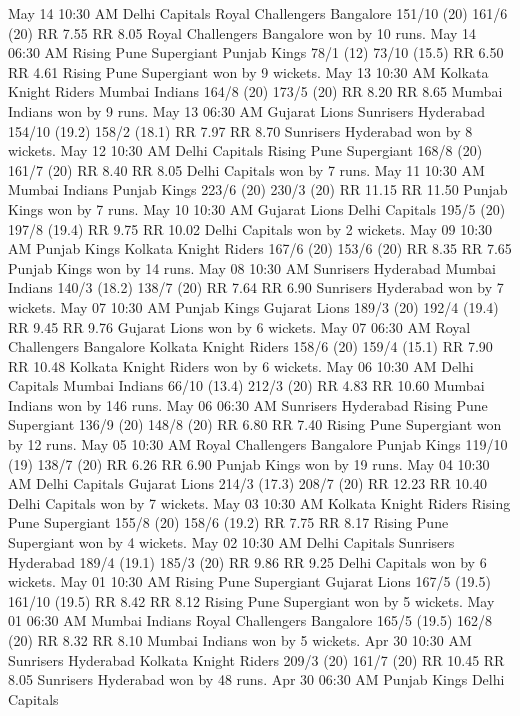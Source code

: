 May 14
10:30 AM
Delhi Capitals
Royal Challengers Bangalore
151/10 (20)
161/6 (20)
RR 7.55
RR 8.05
Royal Challengers Bangalore won by 10 runs.
May 14
06:30 AM
Rising Pune Supergiant
Punjab Kings
78/1 (12)
73/10 (15.5)
RR 6.50
RR 4.61
Rising Pune Supergiant won by 9 wickets.
May 13
10:30 AM
Kolkata Knight Riders
Mumbai Indians
164/8 (20)
173/5 (20)
RR 8.20
RR 8.65
Mumbai Indians won by 9 runs.
May 13
06:30 AM
Gujarat Lions
Sunrisers Hyderabad
154/10 (19.2)
158/2 (18.1)
RR 7.97
RR 8.70
Sunrisers Hyderabad won by 8 wickets.
May 12
10:30 AM
Delhi Capitals
Rising Pune Supergiant
168/8 (20)
161/7 (20)
RR 8.40
RR 8.05
Delhi Capitals won by 7 runs.
May 11
10:30 AM
Mumbai Indians
Punjab Kings
223/6 (20)
230/3 (20)
RR 11.15
RR 11.50
Punjab Kings won by 7 runs.
May 10
10:30 AM
Gujarat Lions
Delhi Capitals
195/5 (20)
197/8 (19.4)
RR 9.75
RR 10.02
Delhi Capitals won by 2 wickets.
May 09
10:30 AM
Punjab Kings
Kolkata Knight Riders
167/6 (20)
153/6 (20)
RR 8.35
RR 7.65
Punjab Kings won by 14 runs.
May 08
10:30 AM
Sunrisers Hyderabad
Mumbai Indians
140/3 (18.2)
138/7 (20)
RR 7.64
RR 6.90
Sunrisers Hyderabad won by 7 wickets.
May 07
10:30 AM
Punjab Kings
Gujarat Lions
189/3 (20)
192/4 (19.4)
RR 9.45
RR 9.76
Gujarat Lions won by 6 wickets.
May 07
06:30 AM
Royal Challengers Bangalore
Kolkata Knight Riders
158/6 (20)
159/4 (15.1)
RR 7.90
RR 10.48
Kolkata Knight Riders won by 6 wickets.
May 06
10:30 AM
Delhi Capitals
Mumbai Indians
66/10 (13.4)
212/3 (20)
RR 4.83
RR 10.60
Mumbai Indians won by 146 runs.
May 06
06:30 AM
Sunrisers Hyderabad
Rising Pune Supergiant
136/9 (20)
148/8 (20)
RR 6.80
RR 7.40
Rising Pune Supergiant won by 12 runs.
May 05
10:30 AM
Royal Challengers Bangalore
Punjab Kings
119/10 (19)
138/7 (20)
RR 6.26
RR 6.90
Punjab Kings won by 19 runs.
May 04
10:30 AM
Delhi Capitals
Gujarat Lions
214/3 (17.3)
208/7 (20)
RR 12.23
RR 10.40
Delhi Capitals won by 7 wickets.
May 03
10:30 AM
Kolkata Knight Riders
Rising Pune Supergiant
155/8 (20)
158/6 (19.2)
RR 7.75
RR 8.17
Rising Pune Supergiant won by 4 wickets.
May 02
10:30 AM
Delhi Capitals
Sunrisers Hyderabad
189/4 (19.1)
185/3 (20)
RR 9.86
RR 9.25
Delhi Capitals won by 6 wickets.
May 01
10:30 AM
Rising Pune Supergiant
Gujarat Lions
167/5 (19.5)
161/10 (19.5)
RR 8.42
RR 8.12
Rising Pune Supergiant won by 5 wickets.
May 01
06:30 AM
Mumbai Indians
Royal Challengers Bangalore
165/5 (19.5)
162/8 (20)
RR 8.32
RR 8.10
Mumbai Indians won by 5 wickets.
Apr 30
10:30 AM
Sunrisers Hyderabad
Kolkata Knight Riders
209/3 (20)
161/7 (20)
RR 10.45
RR 8.05
Sunrisers Hyderabad won by 48 runs.
Apr 30
06:30 AM
Punjab Kings
Delhi Capitals
